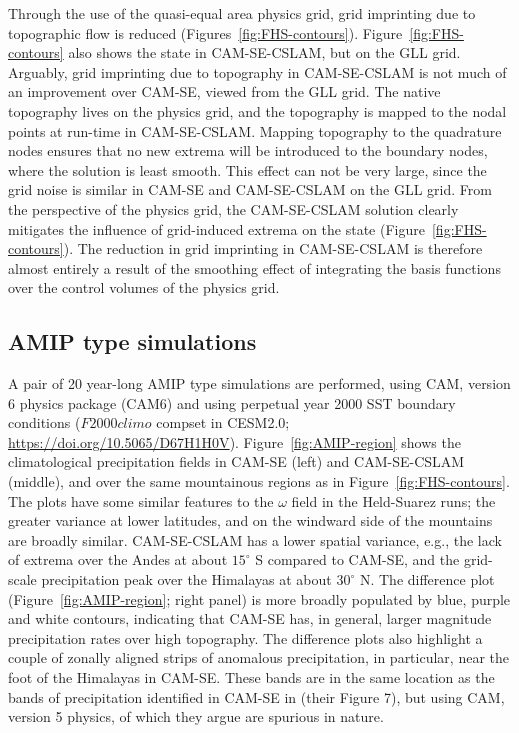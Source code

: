 \documentclass[twocol]{ametsoc}
\begin{document}
Through the use of the quasi-equal area physics grid, grid imprinting due to topographic flow is reduced (Figures~\ref{fig:FHS-contours}). Figure~\ref{fig:FHS-contours} also shows the state in CAM-SE-CSLAM, but on the GLL grid. Arguably, grid imprinting due to topography in CAM-SE-CSLAM is not much of an improvement over CAM-SE, viewed from the GLL grid. The native topography lives on the physics grid, and the topography is mapped to the nodal points at run-time in CAM-SE-CSLAM. Mapping topography to the quadrature nodes ensures that no new extrema will be introduced to the boundary nodes, where the solution is least smooth. This effect can not be very large, since the grid noise is similar in CAM-SE and CAM-SE-CSLAM on the GLL grid. From the perspective of the physics grid, the CAM-SE-CSLAM solution clearly mitigates the influence of grid-induced extrema on the state (Figure~\ref{fig:FHS-contours}). The reduction in grid imprinting in CAM-SE-CSLAM is therefore almost entirely a result of the smoothing effect of integrating the basis functions over the control volumes of the physics grid.

\subsection{{\color{red}AMIP type simulations{}}}

{\color{red}A pair of 20 year-long AMIP type simulations are performed, using CAM, version 6 physics package (CAM6) and using perpetual year 2000 SST boundary conditions ($F2000climo$ compset in CESM2.0; \url{https://doi.org/10.5065/D67H1H0V}). Figure~\ref{fig:AMIP-region} shows the climatological precipitation fields in CAM-SE (left) and CAM-SE-CSLAM (middle), and over the same mountainous regions as in Figure~\ref{fig:FHS-contours}. The plots have some similar features to the $\omega$ field in the Held-Suarez runs; the greater variance at lower latitudes, and on the windward side of the mountains are broadly similar. CAM-SE-CSLAM has a lower spatial variance, e.g., the lack of extrema over the Andes at about $15^\circ$ S compared to CAM-SE, and the grid-scale precipitation peak over the Himalayas at about $30^\circ$ N. The difference plot (Figure~\ref{fig:AMIP-region}; right panel) is more broadly populated by blue, purple and white contours, indicating that CAM-SE has, in general, larger magnitude precipitation rates over high topography. The difference plots also highlight a couple of zonally aligned strips of anomalous precipitation, in particular, near the foot of the Himalayas in CAM-SE. These bands are in the same location as the bands of precipitation identified in CAM-SE in \cite{gmdd-8-4623-2015} (their Figure 7), but using CAM, version 5 physics, of which they argue are spurious in nature.} 
\end{document}
